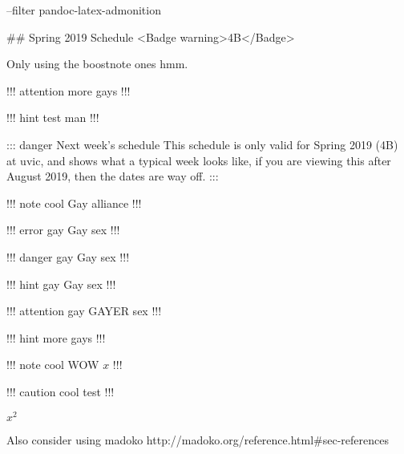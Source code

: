 \documentclass[]{article}
\date{}
\begin{document}
--filter pandoc-latex-admonition

\#\# Spring 2019 Schedule \textless{}Badge
warning\textgreater{}4B\textless{}/Badge\textgreater{}

Only using the boostnote ones hmm.

!!! attention more gays !!!

!!! hint test man !!!

::: danger Next week's schedule This schedule is only valid for Spring
2019 (4B) at uvic, and shows what a typical week looks like, if you are
viewing this after August 2019, then the dates are way off. :::

!!! note cool Gay alliance !!!

!!! error gay Gay sex !!!

!!! danger gay Gay sex !!!

!!! hint gay Gay sex !!!

!!! attention gay GAYER sex !!!

!!! hint more gays !!!

!!! note cool WOW \(x\) !!!

!!! caution cool test !!!

\(x^2\)

Also consider using madoko
http://madoko.org/reference.html\#sec-references
\end{document}
